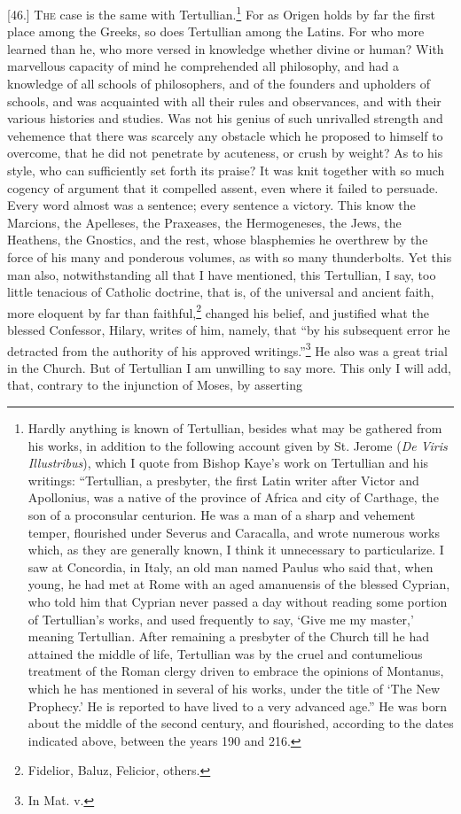 
[46.] \textsc{The} case is the same with Tertullian.\footnote{Hardly anything is known of Tertullian, besides what may be gathered from his works, in addition to the following account given by St. Jerome (\emph{De Viris Illustribus}), which I quote from Bishop Kaye’s work on Tertullian and his writings: “Tertullian, a presbyter, the first Latin writer after Victor and Apollonius, was a native of the province of Africa and city of Carthage, the son of a proconsular centurion. He was a man of a sharp and vehement temper, flourished under Severus and Caracalla, and wrote numerous works which, as they are generally known, I think it unnecessary to particularize. I saw at Concordia, in Italy, an old man named Paulus who said that, when young, he had met at Rome with an aged amanuensis of the blessed Cyprian, who told him that Cyprian never passed a day without reading some portion of Tertullian’s works, and used frequently to say, ‘Give me my master,’ meaning Tertullian. After remaining a presbyter of the Church till he had attained the middle of life, Tertullian was by the cruel and contumelious treatment of the Roman clergy driven to embrace the opinions of Montanus, which he has mentioned in several of his works, under the title of ‘The New Prophecy.’ He is reported to have lived to a very advanced age.” He was born about the middle of the second century, and flourished, according to the dates indicated above, between the years 190 and 216.} For as Origen holds by far the first place among the Greeks, so does Tertullian among the Latins. For who more learned than he, who more versed in knowledge whether divine or human? With marvellous capacity of mind he comprehended all philosophy, and had a knowledge of all schools of philosophers, and of the founders and upholders of schools, and was acquainted with all their rules and observances, and with their various histories and studies. Was not his genius of such unrivalled strength and vehemence that there was scarcely any obstacle which he proposed to himself to overcome, that he did not penetrate by acuteness, or crush by weight? As to his style, who can sufficiently set forth its praise? It was knit together with so much cogency of argument that it compelled assent, even where it failed to persuade. Every word almost was a sentence; every sentence a victory. This know the Marcions, the Apelleses, the Praxeases, the Hermogeneses, the Jews, the Heathens, the Gnostics, and the rest, whose blasphemies he overthrew by the force of his many and ponderous volumes, as with so many thunderbolts. Yet this man also, notwithstanding all that I have mentioned, this Tertullian, I say, too little tenacious of Catholic doctrine, that is, of the universal and ancient faith, more eloquent by far than faithful,\footnote{Fidelior, Baluz, Felicior, others.} changed his belief, and justified what the blessed Confessor, Hilary, writes of him, namely, that “by his subsequent error he detracted from the authority of his approved writings.”\footnote{In Mat. v.} He also was a great trial in the Church. But of Tertullian I am unwilling to say more. This only I will add, that, contrary to the injunction of Moses, by asserting 